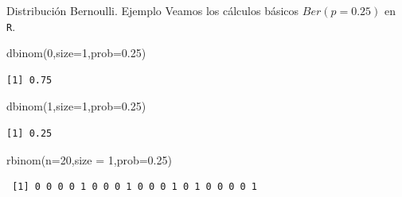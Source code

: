 \documentclass[
  ignorenonframetext,
  aspectratio=169]{beamer}
\newenvironment{Shaded}{\begin{snugshade}}{\end{snugshade}}
\newcommand{\AttributeTok}[1]{\textcolor[rgb]{0.40,0.45,0.13}{#1}}
\newcommand{\DecValTok}[1]{\textcolor[rgb]{0.68,0.00,0.00}{#1}}
\newcommand{\FloatTok}[1]{\textcolor[rgb]{0.68,0.00,0.00}{#1}}
\newcommand{\FunctionTok}[1]{\textcolor[rgb]{0.28,0.35,0.67}{#1}}
\newcommand{\NormalTok}[1]{\textcolor[rgb]{0.00,0.23,0.31}{#1}}
\begin{document}
\begin{frame}[fragile]{Distribución Bernoulli. Ejemplo}
\protect\hypertarget{distribuciuxf3n-bernoulli.-ejemplo}{}
Veamos los cálculos básicos \(Ber(p=0.25)\) en \texttt{R}.

\begin{Shaded}
\begin{Highlighting}[]
\FunctionTok{dbinom}\NormalTok{(}\DecValTok{0}\NormalTok{,}\AttributeTok{size=}\DecValTok{1}\NormalTok{,}\AttributeTok{prob=}\FloatTok{0.25}\NormalTok{)}
\end{Highlighting}
\end{Shaded}

\begin{verbatim}
[1] 0.75
\end{verbatim}

\begin{Shaded}
\begin{Highlighting}[]
\FunctionTok{dbinom}\NormalTok{(}\DecValTok{1}\NormalTok{,}\AttributeTok{size=}\DecValTok{1}\NormalTok{,}\AttributeTok{prob=}\FloatTok{0.25}\NormalTok{)}
\end{Highlighting}
\end{Shaded}

\begin{verbatim}
[1] 0.25
\end{verbatim}

\begin{Shaded}
\begin{Highlighting}[]
\FunctionTok{rbinom}\NormalTok{(}\AttributeTok{n=}\DecValTok{20}\NormalTok{,}\AttributeTok{size =} \DecValTok{1}\NormalTok{,}\AttributeTok{prob=}\FloatTok{0.25}\NormalTok{)}
\end{Highlighting}
\end{Shaded}

\begin{verbatim}
 [1] 0 0 0 0 1 0 0 0 1 0 0 0 1 0 1 0 0 0 0 1
\end{verbatim}
\end{frame}
\end{document}
